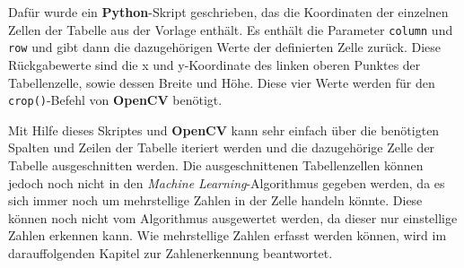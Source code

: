 Dafür wurde ein \textbf{Python}-Skript geschrieben, das die Koordinaten der einzelnen Zellen der Tabelle aus der Vorlage enthält. Es enthält die Parameter \texttt{column} 
und \texttt{row} und gibt dann die dazugehörigen Werte der definierten Zelle zurück. Diese Rückgabewerte sind die x und y-Koordinate des linken oberen Punktes der
Tabellenzelle, sowie dessen Breite und Höhe. Diese vier Werte werden für den \texttt{crop()}-Befehl von \textbf{OpenCV} benötigt.

Mit Hilfe dieses Skriptes und \textbf{OpenCV} kann sehr einfach über die benötigten Spalten und Zeilen der Tabelle iteriert werden und die dazugehörige Zelle der 
Tabelle ausgeschnitten werden. Die ausgeschnittenen Tabellenzellen können jedoch noch nicht in den \textit{Machine Learning}-Algorithmus gegeben werden, da es sich immer
noch um mehrstellige Zahlen in der Zelle handeln könnte. Diese können noch nicht vom Algorithmus ausgewertet werden, da dieser nur einstellige Zahlen erkennen kann.
Wie mehrstellige Zahlen erfasst werden können, wird im darauffolgenden Kapitel zur Zahlenerkennung beantwortet.
